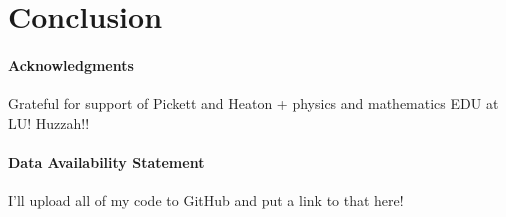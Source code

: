 \documentclass{CUP-JNL-DTM}%
\theoremstyle{definition}
\numberwithin{equation}{section}
\begin{document}
\section{Conclusion}


\begin{Backmatter}

\paragraph{Acknowledgments}

Grateful for support of Pickett and Heaton + physics and mathematics EDU at LU! Huzzah!!

\paragraph{Data Availability Statement}
I'll upload all of my code to GitHub and put a link to that here!




\end{Backmatter}
\end{document}
